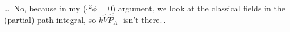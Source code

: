 \documentclass{report}
\begin{document}

\ldots\ No, because in my ($\square^2\phi = 0$) argument, we look at the classical fields in the (partial) path integral, so $k \hat V \hat P_{A_\parallel}$ isn't there.\,. 
\end{document}
